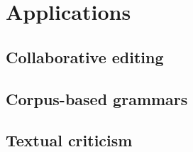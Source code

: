 \chapter{Applications} %
\label{cha:applications}

\section{Collaborative editing} %
\label{sec:collaborativeediting}


\section{Corpus-based grammars} %
\label{sec:corpusbasedgrammars}


\section{Textual criticism} %
\label{sec:textualcriticism}




